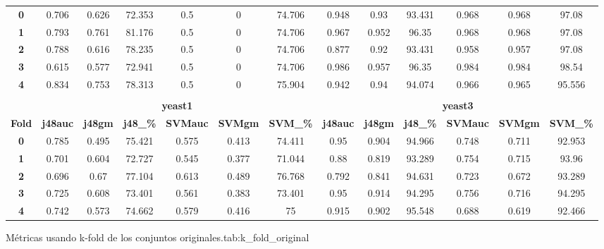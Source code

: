 {{\begin{tabular}{c|cccccc|cccccc}
\midrule
\textbf{0} & 0.706 & 0.626 & 72.353 & 0.5   & 0     & 74.706 & 0.948 & 0.93  & 93.431 & 0.968 & 0.968 & 97.08 \\
\textbf{1} & 0.793 & 0.761 & 81.176 & 0.5   & 0     & 74.706 & 0.967 & 0.952 & 96.35 & 0.968 & 0.968 & 97.08 \\
\textbf{2} & 0.788 & 0.616 & 78.235 & 0.5   & 0     & 74.706 & 0.877 & 0.92  & 93.431 & 0.958 & 0.957 & 97.08 \\
\textbf{3} & 0.615 & 0.577 & 72.941 & 0.5   & 0     & 74.706 & 0.986 & 0.957 & 96.35 & 0.984 & 0.984 & 98.54 \\
\textbf{4} & 0.834 & 0.753 & 78.313 & 0.5   & 0     & 75.904 & 0.942 & 0.94  & 94.074 & 0.966 & 0.965 & 95.556 \\
\multicolumn{1}{c}{} &       &       &       &       &       & \multicolumn{1}{c}{} &       &       &       &       &       &  \\
\multicolumn{1}{c}{} & \multicolumn{6}{c|}{\textbf{yeast1}}          & \multicolumn{6}{c}{\textbf{yeast3}} \\
\midrule
\textbf{Fold} & \textbf{j48auc} & \textbf{j48gm} & \textbf{j48\_\%} & \textbf{SVMauc} & \textbf{SVMgm} & \textbf{SVM\_\%} & \textbf{j48auc} & \textbf{j48gm} & \textbf{j48\_\%} & \textbf{SVMauc} & \textbf{SVMgm} & \textbf{SVM\_\%} \\
\midrule
\textbf{0} & 0.785 & 0.495 & 75.421 & 0.575 & 0.413 & 74.411 & 0.95  & 0.904 & 94.966 & 0.748 & 0.711 & 92.953 \\
\textbf{1} & 0.701 & 0.604 & 72.727 & 0.545 & 0.377 & 71.044 & 0.88  & 0.819 & 93.289 & 0.754 & 0.715 & 93.96 \\
\textbf{2} & 0.696 & 0.67  & 77.104 & 0.613 & 0.489 & 76.768 & 0.792 & 0.841 & 94.631 & 0.723 & 0.672 & 93.289 \\
\textbf{3} & 0.725 & 0.608 & 73.401 & 0.561 & 0.383 & 73.401 & 0.95  & 0.914 & 94.295 & 0.756 & 0.716 & 94.295 \\
\textbf{4} & 0.742 & 0.573 & 74.662 & 0.579 & 0.416 & 75    & 0.915 & 0.902 & 95.548 & 0.688 & 0.619 & 92.466 \\
\end{tabular}}}%
{Métricas usando k-fold de los conjuntos originales.}{tab:k_fold_original}

